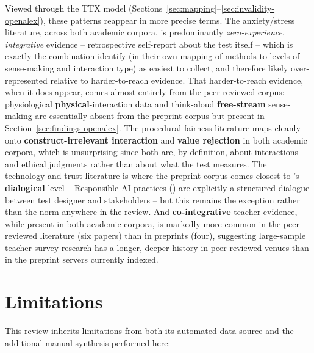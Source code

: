 \documentclass[11pt]{article}
\begin{document}
Viewed through the TTX model (Sections~\ref{sec:mapping}--\ref{sec:invalidity-openalex}), these patterns reappear in more precise terms. The anxiety/stress literature, across both academic corpora, is predominantly \emph{zero-experience}, \emph{integrative} evidence -- retrospective self-report about the test itself -- which is exactly the combination \citet{araneda2025ttxmodel} identify (in their own mapping of methods to levels of sense-making and interaction type) as easiest to collect, and therefore likely over-represented relative to harder-to-reach evidence. That harder-to-reach evidence, when it does appear, comes almost entirely from the peer-reviewed corpus: physiological \textbf{physical}-interaction data and think-aloud \textbf{free-stream} sense-making are essentially absent from the preprint corpus but present in Section~\ref{sec:findings-openalex}. The procedural-fairness literature maps cleanly onto \textbf{construct-irrelevant interaction} and \textbf{value rejection} in both academic corpora, which is unsurprising since both are, by definition, about interactions and ethical judgments rather than about what the test measures. The technology-and-trust literature is where the preprint corpus comes closest to \citeauthor{araneda2025ttxmodel}'s \textbf{dialogical} level -- Responsible-AI practices (\citet{burstein2024responsible}) are explicitly a structured dialogue between test designer and stakeholders -- but this remains the exception rather than the norm anywhere in the review. And \textbf{co-integrative} teacher evidence, while present in both academic corpora, is markedly more common in the peer-reviewed literature (six papers) than in preprints (four), suggesting large-sample teacher-survey research has a longer, deeper history in peer-reviewed venues than in the preprint servers currently indexed.

\section{Limitations}
\label{sec:limitations}

This review inherits limitations from both its automated data source and the additional manual synthesis performed here:
\end{document}
